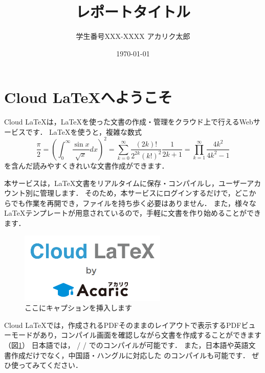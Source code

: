 \documentclass[platex,dvipdfmx]{jlreq}			%
\title{レポートタイトル}
\author{学生番号XXX-XXXX アカリク太郎}
\date{\today}
\begin{document}
\maketitle
\section{Cloud LaTeXへようこそ}

Cloud LaTeXは，\LaTeX を使った文書の作成・管理をクラウド上で行えるWebサービスです．
\LaTeX を使うと，複雑な数式
\begin{equation}
\frac{\pi}{2} =
\left( \int_{0}^{\infty} \frac{\sin x}{\sqrt{x}} dx \right)^2 =
\sum_{k=0}^{\infty} \frac{(2k)!}{2^{2k}(k!)^2} \frac{1}{2k+1} =
\prod_{k=1}^{\infty} \frac{4k^2}{4k^2 - 1}
\end{equation}
を含んだ読みやすくきれいな文書作成ができます．

本サービスは，\LaTeX 文書をリアルタイムに保存・コンパイルし，ユーザーアカウント別に管理します．
そのため，本サービスにログインするだけで，どこからでも作業を再開でき，ファイルを持ち歩く必要はありません．
また，様々な \LaTeX テンプレートが用意されているので，手軽に文書を作り始めることができます．
\begin{figure}
\centering
\includegraphics[width=70mm]{figures/Sample.png}
\caption{ここにキャプションを挿入します}
\label{fig:model}
\end{figure}

Cloud LaTeXでは，作成されるPDFそのままのレイアウトで表示するPDFビューモードがあり，コンパイル画面を確認しながら文書を作成することができます（図\ref{fig:model}）
日本語では， \pLaTeX / \upLaTeX / \LuaLaTeX でのコンパイルが可能です．
また，日本語や英語文書作成だけでなく，中国語・ハングルに対応した \XeLaTeX のコンパイルも可能です．
ぜひ使ってみてください．
\end{document}
